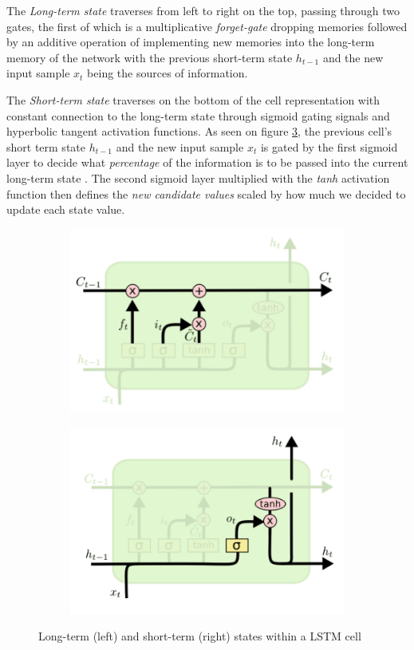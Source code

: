 \documentclass[conference]{IEEEtran}
\begin{document}
The \textit{Long-term state} traverses from left to right on the top, passing through two gates, the first of which is a multiplicative \textit{forget-gate} dropping memories followed by an additive operation of implementing new memories into the long-term memory of the network with the previous short-term state $h_{t-1}$ and the new input sample $x_t$ being the sources of information. 

The \textit{Short-term state} traverses on the bottom of the cell representation with constant connection to the long-term state through sigmoid gating signals and hyperbolic tangent activation functions. As seen on figure \ref{longshort}, the previous cell's short term state $h_{t-1}$ and the new input sample $x_t$ is gated by the first sigmoid layer to decide what \textit{percentage} of the information is to be passed into the current long-term state \cite{colah}. The second sigmoid layer multiplied with the \textit{tanh} activation function then defines the
\textit{new candidate values} scaled by how much we decided to update each state value.
\begin{figure}[h]
\begin{subfigure}{.25\textwidth}
  \centering
  \includegraphics[width=.8\linewidth]{Images/4}
  \label{fig:sfig1}
\end{subfigure}%
\begin{subfigure}{.25\textwidth}
   \centering
  \includegraphics[width=.8\linewidth]{Images/5}
  \label{fig:sfig2}
\end{subfigure}
\caption{Long-term (left) and short-term (right) states within a LSTM cell}
\label{longshort}
\end{figure}
\end{document}
